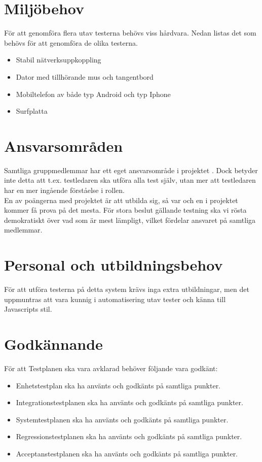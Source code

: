 \documentclass[10pt]{article}
\begin{document}
	

\section{Miljöbehov}
	För att genomföra flera utav testerna behövs viss hårdvara. Nedan listas det som behövs för att genomföra de olika testerna. 

	\begin{itemize}
	\item Stabil nätverksuppkoppling
	\item Dator med tillhörande mus och tangentbord
	\item Mobiltelefon av både typ Android och typ Iphone 
	\item Surfplatta
	\end{itemize}

\section{Ansvarsområden}
	Samtliga gruppmedlemmar har ett eget ansvarsområde i projektet \cite{bib-projektplan}. Dock betyder inte detta att t.ex. testledaren ska utföra alla test själv, utan mer att testledaren har en mer ingående förståelse i rollen. \\
	En av poängerna med projektet är att utbilda sig, så var och en i projektet kommer få prova på det mesta. För stora beslut gällande testning ska vi rösta demokratiskt över vad som är mest lämpligt, vilket fördelar ansvaret på samtliga medlemmar.
	

\section{Personal och utbildningsbehov}
	För att utföra testerna på detta system krävs inga extra utbildningar, men det uppmuntras att vara kunnig i automatisering utav tester och känna till Javascripts stil.

	
	
\section{Godkännande}
	För att Testplanen ska vara avklarad behöver följande vara godkänt:
	\begin{itemize}
	 \item Enhetstestplan ska ha använts och godkänts på samtliga punkter.
	 \item Integrationstestplanen ska ha använts och godkänts på samtliga punkter.
	 \item Systemtestplanen ska ha använts och godkänts på samtliga punkter.
	 \item Regressionstestplanen ska ha använts och godkänts på samtliga punkter.
	 \item Acceptanstestplanen ska ha använts och godkänts på samtliga punkter.
	\end{itemize}
	
\printbibliography	
\end{document}
